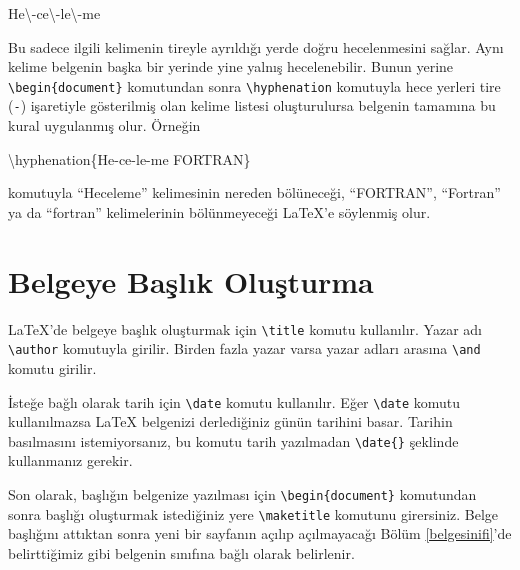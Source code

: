\documentclass[
  10pt,
]{scrbook}
\newenvironment{Shaded}{\begin{snugshade}}{\end{snugshade}}
\newcommand{\FunctionTok}[1]{\textcolor[rgb]{0.00,0.00,0.00}{#1}}
\newcommand{\NormalTok}[1]{#1}
\theoremstyle{definition}
\theoremstyle{definition}
\theoremstyle{definition}
\theoremstyle{definition}
\theoremstyle{remark}
\begin{document}
\begin{Shaded}
\begin{Highlighting}[]
\NormalTok{He}\FunctionTok{\textbackslash{}{-}}\NormalTok{ce}\FunctionTok{\textbackslash{}{-}}\NormalTok{le}\FunctionTok{\textbackslash{}{-}}\NormalTok{me}
\end{Highlighting}
\end{Shaded}

Bu sadece ilgili kelimenin tireyle ayrıldığı yerde doğru hecelenmesini sağlar. Aynı kelime belgenin başka bir yerinde yine yalnış hecelenebilir. Bunun yerine \texttt{\textbackslash{}begin\{document\}} komutundan sonra \texttt{\textbackslash{}hyphenation} komutuyla hece yerleri tire (\texttt{-}) işaretiyle gösterilmiş olan kelime listesi oluşturulursa belgenin tamamına bu kural uygulanmış olur. Örneğin

\begin{Shaded}
\begin{Highlighting}[]
\FunctionTok{\textbackslash{}hyphenation}\NormalTok{\{He{-}ce{-}le{-}me FORTRAN\}}
\end{Highlighting}
\end{Shaded}

komutuyla ``Heceleme'' kelimesinin nereden bölüneceği, ``FORTRAN'', ``Fortran'' ya da ``fortran'' kelimelerinin bölünmeyeceği LaTeX'e söylenmiş olur.

\hypertarget{belgeye-baux15flux131k-oluux15fturma}{%
\section{Belgeye Başlık Oluşturma}\label{belgeye-baux15flux131k-oluux15fturma}}

LaTeX'de belgeye başlık oluşturmak için \texttt{\textbackslash{}title} komutu kullanılır. Yazar adı \texttt{\textbackslash{}author} komutuyla girilir. Birden fazla yazar varsa yazar adları arasına \texttt{\textbackslash{}and} komutu girilir.

İsteğe bağlı olarak tarih için \texttt{\textbackslash{}date} komutu kullanılır. Eğer \texttt{\textbackslash{}date} komutu kullanılmazsa LaTeX belgenizi derlediğiniz günün tarihini basar. Tarihin basılmasını istemiyorsanız, bu komutu tarih yazılmadan \texttt{\textbackslash{}date\{\}} şeklinde kullanmanız gerekir.

Son olarak, başlığın belgenize yazılması için \texttt{\textbackslash{}begin\{document\}} komutundan sonra başlığı oluşturmak istediğiniz yere \texttt{\textbackslash{}maketitle} komutunu girersiniz. Belge başlığını attıktan sonra yeni bir sayfanın açılıp açılmayacağı Bölüm \ref{belgesinifi}'de belirttiğimiz gibi belgenin sınıfına bağlı olarak belirlenir.
\end{document}
